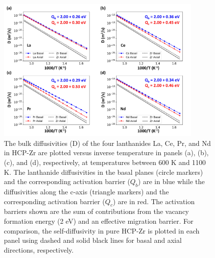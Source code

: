 \documentclass[preprint,12pt]{elsarticle}
\providecommand{\DIFaddbeginFL}{} %
\providecommand{\DIFaddendFL}{} %
\providecommand{\DIFdelbeginFL}{} %
\providecommand{\DIFdelendFL}{} %
\newcommand{\DIFscaledelfig}{0.5}
\newlength{\DIFdelgraphicswidth} %
\newlength{\DIFdelgraphicsheight} %
\newcommand{\DIFaddincludegraphics}[2][]{{\color{blue}\fbox{\DIFOincludegraphics[#1]{#2}}}} %
\newcommand{\DIFdelincludegraphics}[2][]{%
\sbox{\DIFdelgraphicsbox}{\DIFOincludegraphics[#1]{#2}}%
\settoboxwidth{\DIFdelgraphicswidth}{\DIFdelgraphicsbox} %
\settoboxtotalheight{\DIFdelgraphicsheight}{\DIFdelgraphicsbox} %
\scalebox{\DIFscaledelfig}{%
\parbox[b]{\DIFdelgraphicswidth}{\usebox{\DIFdelgraphicsbox}\\[-\baselineskip] \rule{\DIFdelgraphicswidth}{0em}}\llap{\resizebox{\DIFdelgraphicswidth}{\DIFdelgraphicsheight}{%
\setlength{\unitlength}{\DIFdelgraphicswidth}%
\begin{picture}(1,1)%
\thicklines\linethickness{2pt} %
{\color[rgb]{1,0,0}\put(0,0){\framebox(1,1){}}}%
{\color[rgb]{1,0,0}\put(0,0){\line( 1,1){1}}}%
{\color[rgb]{1,0,0}\put(0,1){\line(1,-1){1}}}%
\end{picture}%
}\hspace*{3pt}}} %
} %
\DeclareRobustCommand{\DIFaddbeginFL}{\DIFOaddbeginFL \let\includegraphics\DIFaddincludegraphics} %
\DeclareRobustCommand{\DIFaddendFL}{\DIFOaddendFL \let\includegraphics\DIFOincludegraphics} %
\DeclareRobustCommand{\DIFdelbeginFL}{\DIFOdelbeginFL \let\includegraphics\DIFdelincludegraphics} %
\DeclareRobustCommand{\DIFdelendFL}{\DIFOaddendFL \let\includegraphics\DIFOincludegraphics} %
\begin{document}
\begin{figure}[h!]
    \centering
    \DIFdelbeginFL %
\DIFdelendFL \DIFaddbeginFL \includegraphics[width=0.9\textwidth]{5_diffusivities_Q_updated_added_f0.jpg}
    \DIFaddendFL \caption{The bulk diffusivities (D) of the four lanthanides La, Ce, Pr, and Nd in HCP-Zr are plotted versus inverse temperature in panels (a), (b), (c), and (d), respectively, at temperatures between 600 K and 1100 K. The lanthanide diffusivities in the basal planes (circle markers) and the corresponding activation barrier ($Q_b$) are in blue while the diffusivities along the c-axis (triangle markers) and the corresponding activation barrier ($Q_c$) are in red. The activation barriers shown are the sum of contributions from the vacancy formation energy (2 eV) and an effective migration barrier. %
    For comparison, the self-diffusivity in pure HCP-Zr is plotted in each panel using dashed and solid black lines for basal and axial directions, respectively.}
    \label{fig:diffusivities_ln}
\end{figure}
\end{document}
